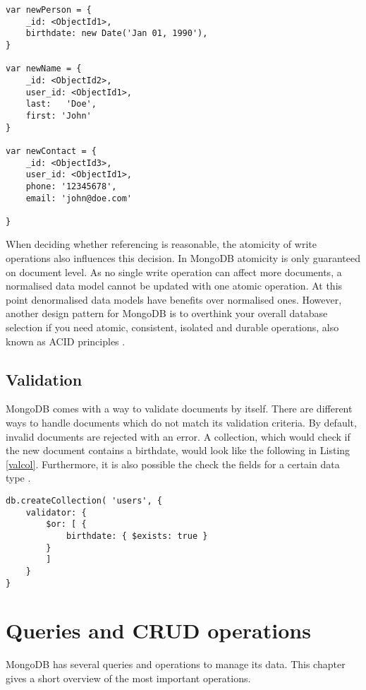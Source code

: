 \begin{lstlisting}[frame=single, caption=Referencing Documents, label=refdoc]
var newPerson = {
	_id: <ObjectId1>,
	birthdate: new Date('Jan 01, 1990'), 
}

var newName = {
	_id: <ObjectId2>,
	user_id: <ObjectId1>,	
    last:	'Doe', 
    first: 'John'
}

var newContact = {
    _id: <ObjectId3>,
    user_id: <ObjectId1>,	
    phone: '12345678',
	email: 'john@doe.com'

}
\end{lstlisting}

When deciding whether referencing is reasonable, the atomicity of write operations also influences this decision. In MongoDB atomicity is only guaranteed on document level. As no single write operation can affect more documents, a normalised data model cannot be updated with one atomic operation. At this point denormalised data models have benefits over normalised ones. However, another design pattern for MongoDB is to overthink your overall database selection if you need atomic, consistent, isolated and durable operations, also known as ACID principles \cite{mdbinaction}. 

\subsection{Validation}
MongoDB comes with a way to validate documents by itself. There are different ways to handle documents which do not match its validation criteria. By default, invalid documents are rejected with an error. A collection, which would check if the new document contains a birthdate, would look like the following in Listing \ref{valcol}. Furthermore, it is also possible the check the fields for a certain data type \cite{mdbdocu}.

\begin{lstlisting}[frame=single, caption=Validation for Collections, label=valcol]
db.createCollection( 'users', {
	validator: { 
	    $or: [ { 
	        birthdate: { $exists: true } 
	    } 
        ] 
    }
}
\end{lstlisting}
		
\section{Queries and CRUD operations}
MongoDB has several queries and operations to manage its data. This chapter gives a short overview of the most important operations.


